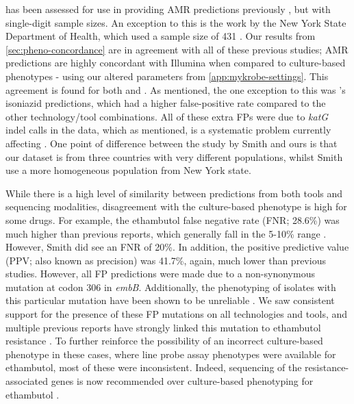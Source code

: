 \ont{} has been assessed for use in providing AMR predictions previously \cite{bradley2015,hunt2019,phelan2019}, but with single-digit sample sizes. An exception to this is the work by the New York State Department of Health, which used a sample size of 431 \cite{smith2020}. Our results from \autoref{sec:pheno-concordance} are in agreement with all of these previous studies; \ont{} AMR predictions are highly concordant with Illumina when compared to culture-based phenotypes - using our altered parameters from \autoref{app:mykrobe-settings}. This agreement is found for both \mykrobe{} and \drprg{}. As mentioned, the one exception to this was \mykrobe{}'s \ont{} isoniazid predictions, which had a higher false-positive rate compared to the other technology/tool combinations. All of these extra FPs were due to \textit{katG} indel calls in the \ont{} data, which as mentioned, is a systematic problem currently affecting \ont{} \cite{watson2019}. One point of difference between the \ont{} study by Smith \etal{} and ours is that our dataset is from three countries with very different \mtb{} populations, whilst Smith \etal{} use a more homogeneous population from New York state. 

While there is a high level of similarity between predictions from both tools and sequencing modalities, disagreement with the culture-based phenotype is high for some drugs. For example, the ethambutol false negative rate (FNR; 28.6\%) was much higher than previous reports, which generally fall in the 5-10\% range \cite{cryptic2018,hunt2019,smith2020}. However, Smith \etal{} did see an FNR of 20\%. In addition, the positive predictive value (PPV; also known as precision) was 41.7\%, again, much lower than previous studies. However, all FP predictions were made due to a non-synonymous mutation at codon 306 in \textit{embB}. Additionally, the phenotyping of isolates with this particular mutation have been shown to be unreliable \cite{Zhang2014,walker2015}. We saw consistent support for the presence of these FP mutations on all technologies and tools, and multiple previous reports have strongly linked this mutation to ethambutol resistance \cite{Maningi2017,Srivastava2009,Brossier2015}. To further reinforce the possibility of an incorrect culture-based phenotype in these cases, where line probe assay phenotypes were available for ethambutol, most of these were inconsistent. Indeed, sequencing of the resistance-associated genes is now recommended over culture-based phenotyping for ethambutol \cite{who2018technical}. 

